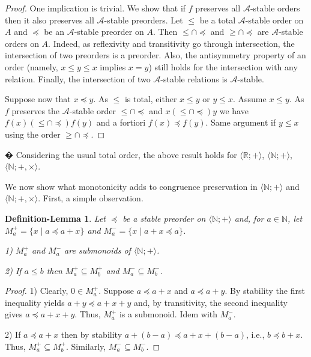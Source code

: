 \documentclass[11pt,a4paper]{article}
\newtheorem{dlemma}[theorem]{Definition-Lemma}
\newtheorem{corollary}[theorem]{Corollary}
\theoremstyle{definition} %
\newcommand\+[1]{\mathcal{#1}} %
\newcommand{\N}{{\mathbb N}}     %
\newcommand{\RR}{{\mathbb R}}    %
\begin{document}
\begin{proof}
One implication is trivial. We show that if $f$ preserves all $\+A$-stable orders
then it also preserves all $\+A$-stable preorders.
Let $\leq$ be a total $\+A$-stable order on $A$ and $\preceq$ be an $\+A$-stable preorder on $A$.
Then ${\leq}\cap{\preceq}$ and ${\geq}\cap{\preceq}$ are $\+A$-stable orders on $A$.
Indeed, as reflexivity and transitivity go through intersection,
the intersection of two preorders is a preorder. Also, the antisymmetry property of an order
(namely, $x\leq y\leq x$ implies $x=y$) still holds for the intersection with any relation.
Finally, the intersection of two $\+A$-stable relations is $\+A$-stable.

Suppose now that $x\preceq y$. As $\leq$ is total, either $x\leq y$ or $y\leq x$.
Assume $x\leq y$. As $f$ preserves the $\+A$-stable order ${\leq}\cap{\preceq}$
and $x({\leq}\cap{\preceq}) y$ we have $f(x)({\leq}\cap{\preceq}) f(y)$ and a fortiori
$f(x)\preceq f(y)$.
Same argument if $y\leq x$ using the order ${\geq}\cap{\preceq}$.
\end{proof}
�
Considering the usual total order, 
the above result holds for  $\langle\RR;+\rangle$,  $\langle\N;+\rangle$,  $\langle\N;+,\times\rangle$. 
\fi

We now show what monotonicity adds to congruence preservation in $\langle\N;+\rangle$ and $\langle\N;+,\times\rangle$.
First, a simple observation.

\begin{dlemma}\label{l:cp and spp on N}
Let $\preceq$ be a stable preorder on $\langle\N;+\rangle$ and, 
for $a\in\N$, let $M^+_a=\{x \mid a\preceq a+x\}$ and $M^-_a=\{x \mid a+x\preceq a\}$.

1) $M^+_a$ and $M^-_a$ are submonoids of $\langle\N;+\rangle$.

2) If $a\leq b$ then $M^+_a \subseteq M^+_b$ and $M^-_a \subseteq M^-_b$.
\end{dlemma}

\begin{proof}
1) Clearly, $0\in M^+_a$. 
Suppose $a\preceq a+x$ and $a\preceq a+y$.
By stability the first inequality yields $a+y\preceq a+x+y$ and, by transitivity,
the second inequality gives $a\preceq a+x+y$. Thus, $M^+_a$ is a submonoid.
Idem with $M^-_a$.

2) If $a\preceq a+x$ then by stability $a+(b-a)\preceq a+x+(b-a)$, i.e., $b\preceq b+x$.
Thus, $M^+_a \subseteq M^+_b$. Similarly, $M^-_a \subseteq M^-_b$. 
\end{proof}
\end{document}
